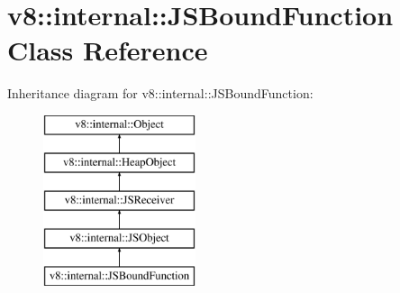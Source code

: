 \hypertarget{classv8_1_1internal_1_1_j_s_bound_function}{}\section{v8\+:\+:internal\+:\+:J\+S\+Bound\+Function Class Reference}
\label{classv8_1_1internal_1_1_j_s_bound_function}
Inheritance diagram for v8\+:\+:internal\+:\+:J\+S\+Bound\+Function\+:\begin{figure}[H]
\begin{center}
\leavevmode
\includegraphics[height=5.000000cm]{classv8_1_1internal_1_1_j_s_bound_function}
\end{center}
\end{figure}
